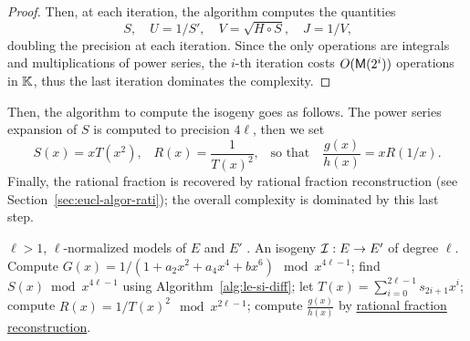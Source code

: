 \begin{proof}
  Then, at each iteration, the algorithm computes the quantities
  \begin{equation}
    \label{eq:174}
    S,\quad U = 1/S',\quad V = \sqrt{H\circ S},\quad J = 1/V\text{,}
  \end{equation}
  doubling the precision at each iteration. Since the only operations
  are integrals and multiplications of power series, the $i$-th
  iteration costs $O(\mathsf{M}(2^i))$ operations in $\mathbb{K}$, thus the last
  iteration dominates the complexity.
\end{proof}


Then, the algorithm to compute the isogeny goes as follows.  The power
series expansion of $S$ is computed to precision $4\ell$, then we set
\begin{equation}
  \label{eq:180}
  S(x) = xT(x^2)
  \text{,}\quad
  R(x) = \frac{1}{T(x)^2}
  \text{,}\quad\text{so that}\quad
  \frac{g(x)}{h(x)} = xR(1/x)
  \text{.}
\end{equation}
Finally, the rational fraction is recovered by rational fraction
reconstruction (see Section~\ref{sec:eucl-algor-rati}); the overall
complexity is dominated by this last step.

\begin{algorithm}
  \caption{}
  \label{alg:bmss}
  \begin{algorithmic}[1]
    \REQUIRE $\ell>1$, $\ell$-normalized models of $E$ and $E'$ .
    \ENSURE An isogeny $\mathcal{I}:E\rightarrow E'$ of degree $\ell$.
    \STATE Compute $G(x) = 1/(1 + a_2x^2 + a_4x^4 + bx^6) \mod x^{4\ell-1}$;
    \STATE find $S(x)\bmod x^{4\ell-1}$ using Algorithm~\ref{alg:le-si-diff};
    \STATE let $T(x) = \sum_{i=0}^{2\ell-1}s_{2i+1}x^i$;
    \STATE compute $R(x) = 1/T(x)^2 \mod x^{2\ell-1}$;
    \STATE compute $\frac{g(x)}{h(x)}$ by \hyperref[sec:eucl-algor-rati]{rational fraction reconstruction}.
  \end{algorithmic}
\end{algorithm}

